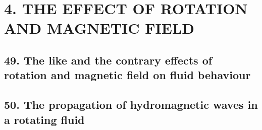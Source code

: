 
\section*{4. THE EFFECT OF ROTATION AND MAGNETIC FIELD}

\subsection*{49. The like and the contrary effects of rotation and magnetic
  field on fluid behaviour}


\subsection*{50. The propagation of hydromagnetic waves in a rotating fluid}

